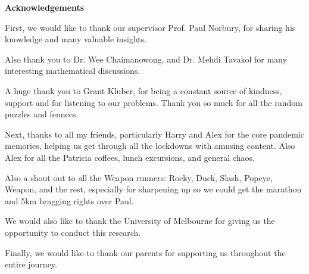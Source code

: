 \thispagestyle{empty}

{
\color{offblack}\Large\bfseries Acknowledgements}

\vspace{2em}


First, we would like to thank our supervisor Prof. Paul Norbury, for sharing his knowledge and many valuable insights. 

Also thank you to Dr. Wee Chaimanowong, and Dr. Mehdi Tavakol for many interesting mathematical discussions.

A huge thank you to Grant Kluber, for being a constant source of kindness, support and for listening to our problems. Thank you so much for all the random puzzles and fennecs.

Next, thanks to all my friends, particularly Harry and Alex for the core pandemic memories, helping us get through all the lockdowns with amusing content. Also Alex for all the Patricia coffees, lunch excursions, and general chaos.

Also a shout out to all the Weapon runners: Rocky, Duck, Slash, Popeye, Weapon, and the rest, especially for sharpening up so we could get the marathon and 5km bragging rights over Paul. 

We would also like to thank the University of Melbourne for giving us the opportunity to conduct this research.

Finally, we would like to thank our parents for supporting us throughout the entire journey.


\vfill
